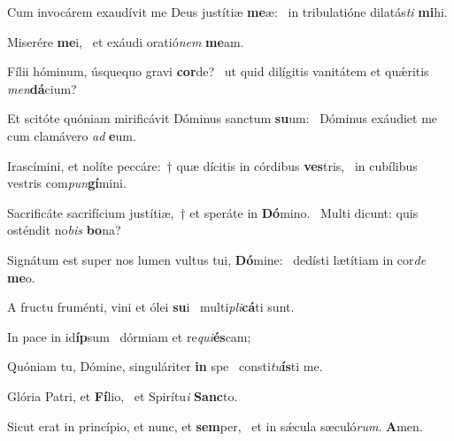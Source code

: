 \item Cum invocárem exaudívit me Deus justítiæ \textbf{me}æ:~\psstar{} in tribulatióne dilatás\textit{ti} \textbf{mi}hi.
\item Miserére \textbf{me}i,~\psstar{} et exáudi oratió\textit{nem} \textbf{me}am.
\item Fílii hóminum, úsquequo gravi \textbf{cor}de?~\psstar{} ut quid dilígitis vanitátem et quǽritis \textit{men}\textbf{dá}cium?
\item Et scitóte quóniam mirificávit Dóminus sanctum \textbf{su}um:~\psstar{} Dóminus exáudiet me cum clamávero \textit{ad} \textbf{e}um.
\item Irascímini, et nolíte peccáre:~† quæ dícitis in córdibus \textbf{ves}tris,~\psstar{} in cubílibus vestris com\textit{pun}\textbf{gí}mini.
\item Sacrificáte sacrifícium justítiæ,~† et speráte in \textbf{Dó}mino.~\psstar{} Multi dicunt: quis osténdit no\textit{bis} \textbf{bo}na?
\item Signátum est super nos lumen vultus tui, \textbf{Dó}mine:~\psstar{} dedísti lætítiam in cor\textit{de} \textbf{me}o.
\item A fructu fruménti, vini et ólei \textbf{su}i~\psstar{} multi\textit{pli}\textbf{cá}ti sunt.
\item In pace in id\textbf{íp}sum~\psstar{} dórmiam et re\textit{qui}\textbf{és}cam;
\item Quóniam tu, Dómine, singuláriter \textbf{in} spe~\psstar{} consti\textit{tu}\textbf{ís}ti me.
\item Glória Patri, et \textbf{Fí}lio,~\psstar{} et Spirítu\textit{i} \textbf{Sanc}to.
\item Sicut erat in princípio, et nunc, et \textbf{sem}per,~\psstar{} et in sǽcula sæculó\textit{rum}. \textbf{A}men.